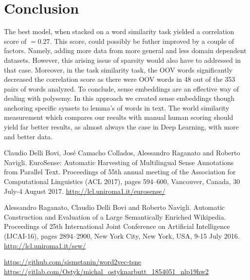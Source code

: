 \documentclass[12pt,a4paper]{article}
\begin{document}
\section{Conclusion}
The best model, when stacked on a word similarity task yielded a correlation score of $= 0.27$. This score, could possibly be futher improved by a couple of factors. Namely, adding more data from more general and less domain dependent datasets. However, this arising issue of sparsity would also have to addressed in that case. Moreover, in the task similarity task, the OOV words significantly decreased the correlation score as there were OOV words in 48 out of the 353 pairs of words analyzed. To conclude, sense embeddings are an effective way of dealing with polysemy.  In this approach we created sense embeddings though anchoring specific synsets to lemma's of words in text. 
The world similarity measurement which compares our results with manual human scoring should yield far better results, as almost always the case in Deep Learning,  with more and better data.

\begin{thebibliography}{1}

 Claudio Delli Bovi, José Camacho Collados, Alessandro Raganato and Roberto Navigli.
EuroSense: Automatic Harvesting of Multilingual Sense Annotations from Parallel Text. Proceedings of 55th annual meeting of the Association for Computational Linguistics (ACL 2017), pages 594–600, Vancouver, Canada, 30 July-4 August 2017. \url{http://lcl.uniroma1.it/eurosense/}

 Alessandro Raganato, Claudio Delli Bovi and Roberto Navigli.
Automatic Construction and Evaluation of a Large Semantically Enriched Wikipedia. Proceedings of 25th International Joint Conference on Artificial Intelligence (IJCAI-16), pages 2894–2900, New York City, New York, USA, 9-15 July 2016. \url{http://lcl.uniroma1.it/sew/}

 \url{https://github.com/sismetanin/word2vec-tsne}
 \url{https://gitlab.com/Ostyk/michal_ostyknarbutt_1854051_nlp19hw2}
\end{thebibliography}
\end{document}
